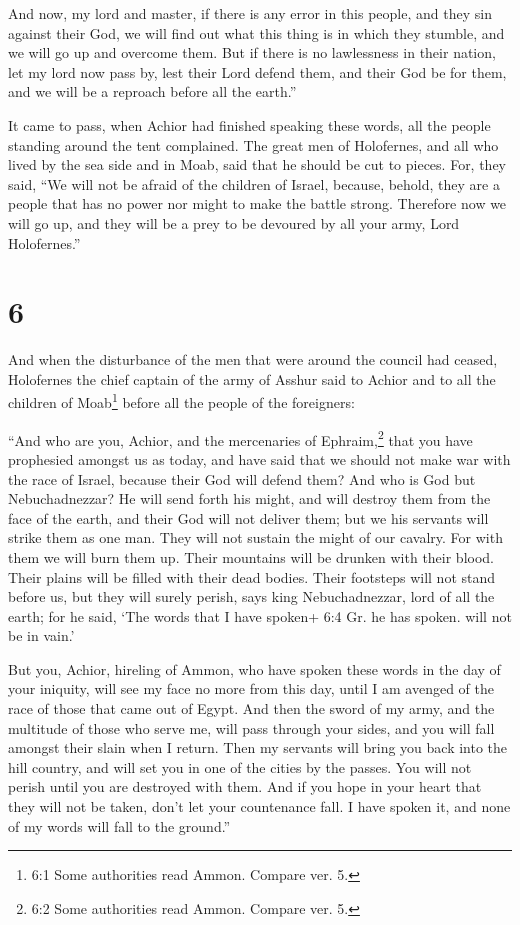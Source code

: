  And now, my lord and master, if there is any error in this
people, and they sin against their God, we will find out what this thing
is in which they stumble, and we will go up and overcome them.
 But if there is no lawlessness in their nation, let my
lord now pass by, lest their Lord defend them, and their God be for
them, and we will be a reproach before all the earth.''

 It came to pass, when Achior had finished speaking these
words, all the people standing around the tent complained. The great men
of Holofernes, and all who lived by the sea side and in Moab, said that
he should be cut to pieces.  For, they said, ``We will not
be afraid of the children of Israel, because, behold, they are a people
that has no power nor might to make the battle strong. 
Therefore now we will go up, and they will be a prey to be devoured by
all your army, Lord Holofernes.''

\hypertarget{section-5}{%
\section{6}\label{section-5}}

 And when the disturbance of the men that were around the
council had ceased, Holofernes the chief captain of the army of Asshur
said to Achior and to all the children of Moab\footnote{6:1 Some
  authorities read Ammon. Compare ver. 5.} before all the people of the
foreigners:

 ``And who are you, Achior, and the mercenaries of
Ephraim,\footnote{6:2 Some authorities read Ammon. Compare ver. 5.} that
you have prophesied amongst us as today, and have said that we should
not make war with the race of Israel, because their God will defend
them? And who is God but Nebuchadnezzar?  He will send forth
his might, and will destroy them from the face of the earth, and their
God will not deliver them; but we his servants will strike them as one
man. They will not sustain the might of our cavalry.  For
with them we will burn them up. Their mountains will be drunken with
their blood. Their plains will be filled with their dead bodies. Their
footsteps will not stand before us, but they will surely perish, says
king Nebuchadnezzar, lord of all the earth; for he said, `The words that
I have spoken+ 6:4 Gr. he has spoken. will not be in vain.'

 But you, Achior, hireling of Ammon, who have spoken these
words in the day of your iniquity, will see my face no more from this
day, until I am avenged of the race of those that came out of Egypt.
 And then the sword of my army, and the multitude of those
who serve me, will pass through your sides, and you will fall amongst
their slain when I return.  Then my servants will bring you
back into the hill country, and will set you in one of the cities by the
passes.  You will not perish until you are destroyed with
them.  And if you hope in your heart that they will not be
taken, don't let your countenance fall. I have spoken it, and none of my
words will fall to the ground.''

